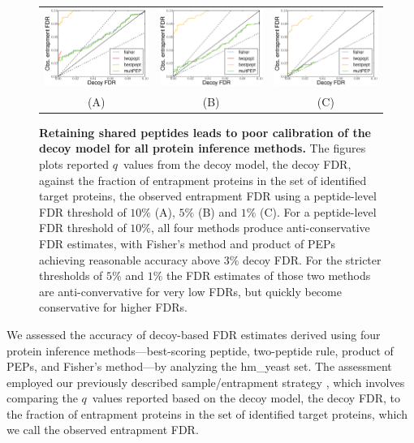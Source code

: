 \documentclass{article}
\begin{document}
\begin{figure}
\begin{center}
\begin{tabular}{ccc} 
\includegraphics[width=0.3\linewidth]
  {./img/shared-pept-accuracy-fdr10} &
\includegraphics[width=0.3\linewidth]
  {./img/shared-pept-accuracy-fdr5} & 
\includegraphics[width=0.3\linewidth]
  {./img/shared-pept-accuracy-fdr1}\\
(A) & (B) & (C)
\end{tabular}
\caption{\label{fig:shared-accuracy}\textbf{Retaining shared peptides
    leads to poor calibration of the decoy model for all protein
    inference methods.} The figures plots reported $q$~values from
  the decoy model, the decoy FDR, against the fraction of entrapment
  proteins in the set of identified target proteins, the observed
  entrapment FDR using a peptide-level FDR threshold of $10\%$ (A),
  $5\%$ (B) and $1\%$ (C). For a peptide-level FDR threshold of 
  $10\%$, all four methods produce anti-conservative FDR estimates, 
  with Fisher's method and product of PEPs achieving reasonable 
  accuracy above $3\%$ decoy FDR. For the stricter thresholds of 
  $5\%$ and $1\%$ the FDR estimates of those two methods are 
  anti-convervative for very low FDRs, but quickly become 
  conservative for higher FDRs.}
\end{center}
\end{figure}

We assessed the accuracy of decoy-based FDR estimates derived using
four protein inference methods---best-scoring peptide, two-peptide
rule, product of PEPs, and Fisher's method---by analyzing the
hm\_yeast set.  The assessment employed our previously described
sample/entrapment strategy \cite{granholm2013determining}, which
involves comparing the $q$~values reported based on the decoy model,
the decoy FDR, to the fraction of entrapment proteins in the set of
identified target proteins, which we call the observed entrapment FDR.
\end{document}
